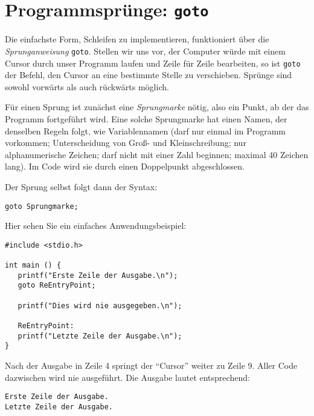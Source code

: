 \section{Programmsprünge: \texttt{goto}}
Die einfachste Form, Schleifen zu implementieren, funktioniert über die \emph{Sprunganweisung} \texttt{goto}. Stellen wir uns vor, der Computer würde mit einem Cursor durch unser Programm laufen und Zeile für Zeile bearbeiten, so ist \texttt{goto} der Befehl, den Cursor an eine bestimmte Stelle zu verschieben. Sprünge sind sowohl vorwärts als auch rückwärts möglich.

Für einen Sprung ist zunächst eine \emph{Sprungmarke} nötig, also ein Punkt, ab der das Programm fortgeführt wird. Eine solche Sprungmarke hat einen Namen, der denselben Regeln folgt, wie Variablennamen (darf nur einmal im Programm vorkommen; Unterscheidung von Groß- und Kleinschreibung; nur alphanumerische Zeichen; darf nicht mit einer Zahl beginnen; maximal 40 Zeichen lang). Im Code wird sie durch einen Doppelpunkt abgeschlossen.

Der Sprung selbst folgt dann der Syntax:
\begin{codebox}
\begin{verbatim}
goto Sprungmarke;
\end{verbatim}
\end{codebox}

Hier sehen Sie ein einfaches Anwendungsbeispiel:
\begin{codebox}
\begin{verbatim}
#include <stdio.h>

int main () {
   printf("Erste Zeile der Ausgabe.\n");
   goto ReEntryPoint;   
   
   printf("Dies wird nie ausgegeben.\n");
   
   ReEntryPoint:
   printf("Letzte Zeile der Ausgabe.\n");
}
\end{verbatim}
\end{codebox}

Nach der Ausgabe in Zeile 4 springt der \enquote{Cursor} weiter zu Zeile 9. Aller Code dazwischen wird nie ausgeführt. Die Ausgabe lautet entsprechend:

\begin{cmdbox}
\begin{verbatim}
Erste Zeile der Ausgabe.
Letzte Zeile der Ausgabe.
\end{verbatim}
\end{cmdbox}

